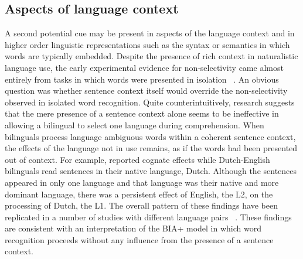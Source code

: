 \subsection{Aspects of language context}
\label{aspectsoflanguagecontext}

A second potential cue may be present in aspects of the language context and in higher order linguistic representations such as the syntax or semantics in which words are typically embedded. Despite the presence of rich context in naturalistic language use, the early experimental evidence for non-selectivity came almost entirely from tasks in which words were presented in isolation ~\citep[e.g.,][]{Dijkstra1998,Dijkstra1999, Schwartz2007, VanHell2002}. An obvious question was whether sentence context itself would override the non-selectivity observed in isolated word recognition. Quite counterintuitively, research suggests that the mere presence of a sentence context alone seems to be ineffective in allowing a bilingual to select one language during comprehension. When bilinguals process language ambiguous words within a coherent sentence context, the effects of the language not in use remains, as if the words had been presented out of context. For example,  \citet{VanAssche2009} reported cognate effects while Dutch-English bilinguals read sentences in their native language, Dutch. Although the sentences appeared in only one language and that language was their native and more dominant language, there was a persistent effect of English, the L2, on the processing of Dutch, the L1. The overall pattern of these findings have been replicated in a number of studies with different language pairs ~\citep[e.g.,][]{Duyck2007, Libben2009, Schwartz2007, VanAssche2009, VanAssche2010}. These findings are consistent with an interpretation of the BIA+ model in which word recognition proceeds without any influence from the presence of a sentence context.

